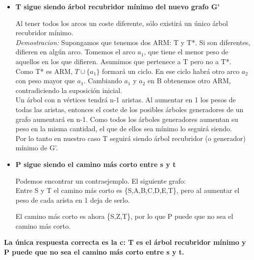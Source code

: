 \documentclass[10pt,a4paper]{article}
\begin{document}
\begin{itemize}
\item \textbf{T sigue siendo árbol recubridor mínimo del nuevo grafo G'}\par
Al tener todos los arcos un coste diferente, sólo existirá un único árbol recubridor mínimo. \\
\textit{Demostracion:} Supongamos que tenemos dos ARM: T y T*. Si son diferentes, difieren en algún arco. Tomemos el arco $a_1$, que tiene el menor peso de aquellos en los que difieren. Asumimos que pertenece a T pero no a T*. Como T* es ARM, $T\cup \{a_1\}$ formará un ciclo. En ese ciclo habrá otro arco $a_2$ con peso mayor que $a_1$. Cambiando $a_1$ y $a_2$ en B obtenemos otro ARM, contradiciendo la suposición inicial.\\
Un árbol con n vértices tendrá n-1 aristas. Al aumentar en 1 los pesos de todas las aristas, entonces el coste de los posibles árboles generadores de un grafo aumentará en n-1. Como todos los árboles generadores aumentan su peso en la misma cantidad, el que de ellos sea mínimo lo seguirá siendo. \\
Por lo tanto en nuestro caso T seguirá siendo árbol recubridor (o generador) mínimo de G'.
\item \textbf{P sigue siendo el camino más corto entre s y t}\par
Podemos encontrar un contraejemplo. El siguiente grafo:\\

Entre S y T el camino más corto es \{S,A,B,C,D,E,T\}, pero al aumentar el peso de cada arista en 1 deja de serlo.

El camino más corto es ahora \{S,Z,T\}, por lo que P puede que no sea el camino más corto.
\end{itemize}
\textbf{La única respuesta correcta es la c: T es el árbol recubridor mínimo y P puede que no sea el camino más corto entre s y t.}
\end{document}
